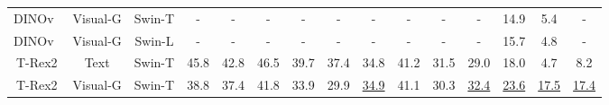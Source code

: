 \begin{table}[t]
{\begin{tabular}{ccc|c|cccccccc|cc|c}
      DINOv~\cite{li2023visual}                   & Visual-G                                                                & Swin-T                    & -                                                            & -             & -             & -             & \multicolumn{1}{c|}{-}             & -             & -             & -             & -             & 14.9                                   & 5.4                                   & -                                                               \\
      DINOv~\cite{li2023visual}                   & Visual-G                                                                & Swin-L                    & -                                                            & -             & -             & -             & \multicolumn{1}{c|}{-}             & -             & -             & -             & -             & 15.7                                   & 4.8                                   & -                                                               \\ \hline
      T-Rex2                  & Text                                                                    & Swin-T                    & \cellcolor{red!5}45.8                                        & \cellcolor{red!5}42.8          & \cellcolor{red!5}46.5          & \cellcolor{red!5}39.7          & \multicolumn{1}{c|}{\cellcolor{red!5}37.4}          & \cellcolor{red!5}34.8          & \cellcolor{red!5}41.2          & \cellcolor{red!5}31.5          & \cellcolor{green!5}29.0          & \cellcolor{green!5}18.0                                   & \cellcolor{green!5}4.7                                   & \cellcolor{green!5}8.2                                                             \\
      T-Rex2                  & Visual-G                                                                & Swin-T                    & \cellcolor{red!5}38.8                                        & \cellcolor{red!5}37.4          & \cellcolor{red!5}41.8          & \cellcolor{red!5}33.9          & \multicolumn{1}{c|}{\cellcolor{red!5}29.9}          & \cellcolor{red!5}\underline{34.9}          & \cellcolor{red!5}41.1          & \cellcolor{red!5}30.3          & \cellcolor{green!5}\underline{32.4}          & \cellcolor{green!5}\underline{23.6}                                   & \cellcolor{green!5}\underline{17.5}                                  & \cellcolor{green!5}\underline{17.4}                                                            \\ \hline

\end{tabular}}
\end{table}
